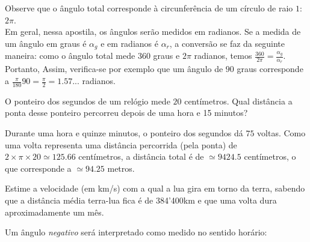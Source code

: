  \begin{center}
 \begin{bmlimage}\end{bmlimage}
 \end{center}
Observe que o ângulo total corresponde à circunferência de um círculo de raio $1$:
$2\pi$.\\


 Em geral, nessa apostila, os ângulos serão medidos em radianos. Se a medida de um ângulo
em graus é $\alpha_g$ e em radianos é $\alpha_r$,
 a conversão se faz da seguinte maneira: como o ângulo total mede $360$ graus e $2\pi$
radianos, temos $\frac{360}{2\pi}=\frac{\alpha_g}{\alpha_r}$. Portanto,
Assim, verifica-se por exemplo que um ângulo de $90$ graus corresponde a
$\frac{\pi}{180}90=\tfrac{\pi}{2}=1.57...$ radianos.

\begin{exo} O ponteiro dos segundos de um relógio mede $20$ 
centímetros. Qual distância a
ponta desse ponteiro percorreu depois de uma hora e 15 minutos?
 \begin{sol} Durante uma hora e quinze minutos, o ponteiro dos segundos 
dá $75$ voltas.
Como uma volta representa uma distância percorrida (pela ponta) de 
$2\times \pi\times
20\simeq 125.66$ centímetros, a distância total é de $\simeq 9424.5$ 
centímetros, o que corresponde a $\simeq 94.25$ metros.
\end{sol}
\end{exo}

\begin{exo}
Estime a velocidade (em km/s) com a qual a lua gira em torno 
da terra, sabendo que a distância média terra-lua fica é de 384'400km
e que uma volta dura aproximadamente um mês.
\end{exo}

Um ângulo \emph{negativo} será interpretado como medido no sentido horário:
\begin{center}
\begin{bmlimage}\end{bmlimage}
\end{center}

